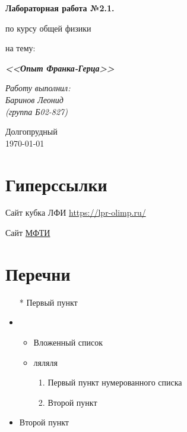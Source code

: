 \documentclass[a4paper,14pt]{extarticle}
\begin{document}
\begin{center}
	\vspace{13ex}
	
	\textbf{Лабораторная работа №2.1.}
	
	\vspace{1ex}
	
	по курсу общей физики
	
	на тему:
	
	\textbf{\textit{<<Опыт Франка-Герца>>}}
	
	\vspace{30ex}
	
	\begin{flushright}
		\noindent
		\textit{Работу выполнил:}\\  
		\textit{Баринов Леонид \\(группа Б02-827)}
	\end{flushright}
	\vfill
	Долгопрудный \\ \today
	
\end{center}
\newpage

\section{Гиперссылки}

Сайт кубка ЛФИ \url{https://lpr-olimp.ru/}

Сайт \href{https://mipt.ru/}{МФТИ}


\section{Перечни}

\begin{itemize}
	\item[*] Первый пункт 
	\item 
	\begin{itemize}
		\item Вложенный список
		\item ляляля 
		\begin{enumerate}
			\item Первый пункт нумерованного списка
			\item Второй пункт
		\end{enumerate}
	\end{itemize}
	\item Второй пункт
\end{itemize}
\end{document}
